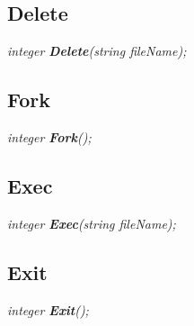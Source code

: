 \documentclass[11pt]{article}
\begin{document}
\subsection{Delete}
\textit{integer \textbf{Delete}(string fileName);}


\subsection{Fork}
\textit{integer \textbf{Fork}();}

\subsection{Exec}
\textit{integer \textbf{Exec}(string fileName);}

\subsection{Exit}
\textit{integer \textbf{Exit}();}
\end{document}
